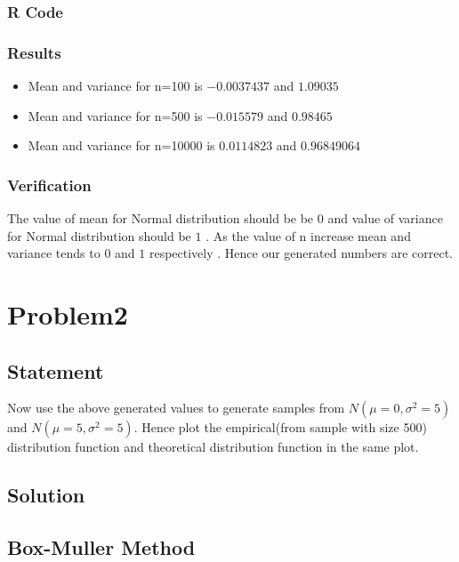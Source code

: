\documentclass[10pt]{article}
\begin{document}
\subsubsection{R Code}



\subsubsection{Results}
\begin{itemize}
\item Mean and variance for n=100 is $ -0.0037437 $ and $ 1.09035 $
\item Mean and variance for n=500 is  $-0.015579$ and $ 0.98465 $
\item Mean and variance for n=10000 is  $ 0.0114823 $ and $ 0.96849064 $
\end{itemize}

\subsubsection{Verification}
The value of mean for Normal distribution should be  be $ 0 $ and value of variance  for Normal distribution should be  $ 1 $ . As the value of n increase mean and variance tends to $ 0 $ and $ 1 $ respectively . Hence our generated numbers are correct. 
\pagebreak
\section{Problem2}
\subsection{Statement}
Now use the above generated values to generate samples from  $N(\mu = 0 , \sigma^2= 5 )$ and $N(\mu = 5 , \sigma^2= 5 )$. Hence plot the empirical(from sample with size 500) distribution function and theoretical distribution function in the same plot.
\subsection{Solution}
\subsection{Box-Muller Method}
\enlargethispage*{1000pt}
\end{document}
